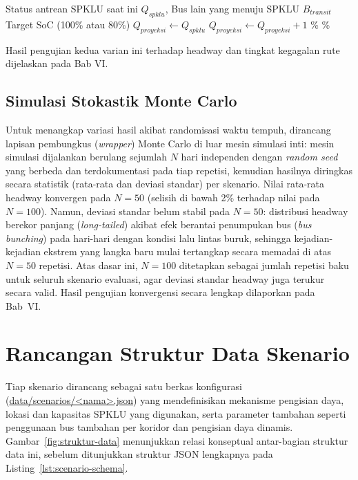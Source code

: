 \begin{algorithm}[h]
\caption{Algoritma Pengisian Daya Dinamis V2 (\textit{Queue-aware})}
\label{alg:dinamis-v2}
\begin{algorithmic}[1]
\Require Status antrean SPKLU saat ini $Q_{spklu}$, Bus lain yang menuju SPKLU $B_{transit}$
\Ensure Target SoC (100\% atau 80\%)
\State $Q_{proyeksi} \gets Q_{spklu}$
        \State $Q_{proyeksi} \gets Q_{proyeksi} + 1$
    \EndIf
\EndFor
{}
    \State {}\%
\Else
    \State {}\%
\EndIf
\end{algorithmic}
\end{algorithm}

Hasil pengujian kedua varian ini terhadap headway dan tingkat kegagalan
rute dijelaskan pada Bab VI.

\subsection{Simulasi Stokastik Monte Carlo}

Untuk menangkap variasi hasil akibat randomisasi waktu tempuh, dirancang
lapisan pembungkus (\textit{wrapper}) Monte Carlo di luar mesin simulasi
inti: mesin simulasi dijalankan berulang sejumlah $N$ hari independen
dengan \textit{random seed} yang berbeda dan terdokumentasi pada tiap
repetisi, kemudian hasilnya diringkas secara statistik (rata-rata dan
deviasi standar) per skenario. Nilai rata-rata headway konvergen pada
$N=50$ (selisih di bawah 2\% terhadap nilai pada $N=100$). Namun,
deviasi standar belum stabil pada $N=50$: distribusi headway berekor
panjang (\textit{long-tailed}) akibat efek berantai penumpukan bus
(\textit{bus bunching}) pada hari-hari dengan kondisi lalu lintas buruk,
sehingga kejadian-kejadian ekstrem yang langka baru mulai tertangkap
secara memadai di atas $N=50$ repetisi. Atas dasar ini, $N=100$
ditetapkan sebagai jumlah repetisi baku untuk seluruh skenario evaluasi,
agar deviasi standar headway juga terukur secara valid. Hasil pengujian
konvergensi secara lengkap dilaporkan pada Bab~VI.

\section{Rancangan Struktur Data Skenario}

Tiap skenario dirancang sebagai satu berkas konfigurasi
(\url{data/scenarios/<nama>.json}) yang mendefinisikan mekanisme
pengisian daya, lokasi dan kapasitas SPKLU yang digunakan, serta parameter
tambahan seperti penggunaan bus tambahan per koridor dan pengisian daya
dinamis. Gambar~\ref{fig:struktur-data} menunjukkan relasi konseptual
antar-bagian struktur data ini, sebelum ditunjukkan struktur JSON
lengkapnya pada Listing~\ref{lst:scenario-schema}.

